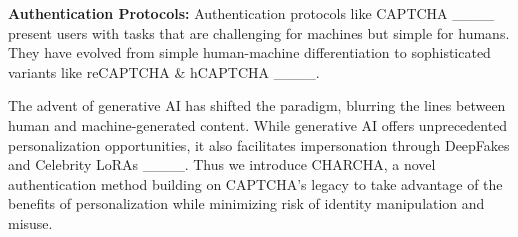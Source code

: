 \textbf{Authentication Protocols:} Authentication protocols like CAPTCHA ____ present users with tasks that are challenging for machines but simple for humans. They have evolved from simple human-machine differentiation to sophisticated variants like reCAPTCHA \& hCAPTCHA ____. 

The advent of generative AI has shifted the paradigm, blurring the lines between human and machine-generated content. While generative AI offers unprecedented personalization opportunities, it also facilitates impersonation through DeepFakes and Celebrity LoRAs ____. Thus we introduce CHARCHA, a novel authentication method building on CAPTCHA's legacy to take advantage of the benefits of personalization while minimizing risk of identity manipulation and misuse.